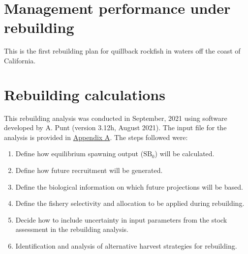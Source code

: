\documentclass[11pt,
  english,
  letterpaper,
]{article}
\begin{document}
\leavevmode\tagmcend\tagstructend\par


\hypertarget{management-performance-under-rebuilding}{%
\section{Management performance under rebuilding}\label{management-performance-under-rebuilding}}

\leavevmode\tagmcend\tagstructend


This is the first rebuilding plan for quillback rockfish in waters off the coast of California.

\leavevmode\tagmcend\tagstructend\par


\hypertarget{rebuilding-calculations}{%
\section{Rebuilding calculations}\label{rebuilding-calculations}}

\leavevmode\tagmcend\tagstructend


This rebuilding analysis was conducted in September, 2021 using software developed by A. Punt (version 3.12h, August 2021). The input file for the analysis is provided in {\protect\hyperlink{append_a}{Appendix A}\leavevmode\tagmcend\tagstructend}. The steps followed were:

\leavevmode\tagmcend\tagstructend\par

\begin{enumerate}
    \item Define how equilibrium spawning output ($\text{SB}_0$) will be calculated. 
    \item Define how future recruitment will be generated.
    \item Define the biological information on which future projections will be based.
    \item Define the fishery selectivity and allocation to be applied during rebuilding. 
    \item Decide how to include uncertainty in input parameters from the stock assessment in the rebuilding analysis. 
    \item Identification and analysis of alternative harvest strategies for rebuilding. 
\end{enumerate}
\end{document}
